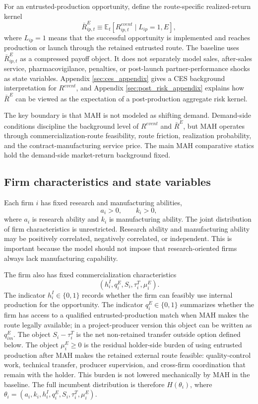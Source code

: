 \documentclass[12pt]{article}
\newcommand{\E}{\mathbb{E}}
\newcommand{\1}{\mathbf{1}}
\begin{document}
For an entrusted-production opportunity, define the route-specific realized-return kernel
\begin{equation}
    \bar R^E_{ip,t}
    \equiv
    \E_t\!\left[R^{event}_{ip,t}\mid L_{ip}=1,E\right],
    \label{eq:RbarE}
\end{equation}
where $L_{ip}=1$ means that the successful opportunity is implemented and reaches production or launch through the retained entrusted route. The baseline uses $\bar R^E_{ip,t}$ as a compressed payoff object. It does not separately model sales, after-sales service, pharmacovigilance, penalties, or post-launch partner-performance shocks as state variables. Appendix \ref{sec:ces_appendix} gives a CES background interpretation for $R^{event}$, and Appendix \ref{sec:post_risk_appendix} explains how $\bar R^E$ can be viewed as the expectation of a post-production aggregate risk kernel.

The key boundary is that MAH is not modeled as shifting demand. Demand-side conditions discipline the background level of $R^{event}$ and $\bar R^E$, but MAH operates through commercialization-route feasibility, route friction, realization probability, and the contract-manufacturing service price. The main MAH comparative statics hold the demand-side market-return background fixed.

\subsection{Firm characteristics and state variables}

Each firm $i$ has fixed research and manufacturing abilities,
\begin{equation}
    a_i>0,\qquad k_i>0,
    \label{eq:jointdist}
\end{equation}
where $a_i$ is research ability and $k_i$ is manufacturing ability. The joint distribution of firm characteristics is unrestricted. Research ability and manufacturing ability may be positively correlated, negatively correlated, or independent. This is important because the model should not impose that research-oriented firms always lack manufacturing capability.

The firm also has fixed commercialization characteristics
\[
    (h_i^I,q_i^E,S_i,\tau_i^T,\mu_i^E).
\]
The indicator $h_i^I\in\{0,1\}$ records whether the firm can feasibly use internal production for the opportunity. The indicator $q_i^E\in\{0,1\}$ summarizes whether the firm has access to a qualified entrusted-production match when MAH makes the route legally available; in a project-producer version this object can be written as $q_{im}^E$. The object $S_i-\tau_i^T$ is the net non-retained transfer outside option defined below. The object $\mu_i^E\ge0$ is the residual holder-side burden of using entrusted production after MAH makes the retained external route feasible: quality-control work, technical transfer, producer supervision, and cross-firm coordination that remain with the holder. This burden is not lowered mechanically by MAH in the baseline. The full incumbent distribution is therefore $H(\theta_i)$, where $\theta_i=(a_i,k_i,h_i^I,q_i^E,S_i,\tau_i^T,\mu_i^E)$.
\end{document}
